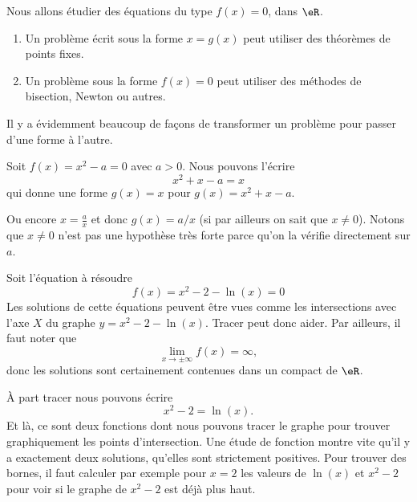 Nous allons étudier des équations du type \( f(x)=0\), dans \( \eR\).

\begin{enumerate}
	\item
Un problème écrit sous la forme \( x=g(x)\) peut utiliser des théorèmes de points fixes.
\item
	Un problème sous la forme \( f(x)=0\) peut utiliser des méthodes de bisection, Newton ou autres.
\end{enumerate}
Il y a évidemment beaucoup de façons de transformer un problème pour passer d'une forme à l'autre.

\begin{example}
	Soit \( f(x)=x^2-a=0\) avec \( a>0\). Nous pouvons l'écrire
	\begin{equation}
		x^2+x-a=x
	\end{equation}
	qui donne une forme \( g(x)=x\) pour \( g(x)=x^2+x-a\).

	Ou encore \( x=\frac{ a }{ x }\) et donc \( g(x)=a/x\) (si par ailleurs on sait que \( x\neq 0\)). Notons que \( x\neq 0\) n'est pas une hypothèse très forte parce qu'on la vérifie directement sur \( a\).
\end{example}

\begin{example}
	Soit l'équation à résoudre
	\begin{equation}
		f(x)=x^2-2-\ln(x)=0
	\end{equation}
	Les solutions de cette équations peuvent être vues comme les intersections avec l'axe \( X\) du graphe \( y=x^2-2-\ln(x)\). Tracer peut donc aider. Par ailleurs, il faut noter que
	\begin{equation}
		\lim_{x\to \pm\infty} f(x)=\infty,
	\end{equation}
	donc les solutions sont certainement contenues dans un compact de \( \eR\).

	À part tracer nous pouvons écrire
	\begin{equation}
		x^2-2=\ln(x).
	\end{equation}
	Et là, ce sont deux fonctions dont nous pouvons tracer le graphe pour trouver graphiquement les points d'intersection. Une étude de fonction montre vite qu'il y a exactement deux solutions, qu'elles sont strictement positives. Pour trouver des bornes, il faut calculer par exemple pour \( x=2\) les valeurs de \( \ln(x)\) et \( x^2-2\) pour voir si le graphe de \( x^2-2\) est déjà plus haut.
\end{example}

